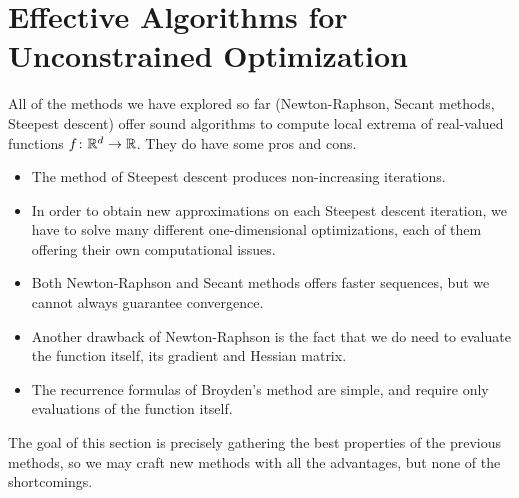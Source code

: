 \section{Effective Algorithms for Unconstrained Optimization}
All of the methods we have explored so far (Newton-Raphson, Secant methods, Steepest descent) offer sound algorithms to compute local extrema of real-valued functions $f \colon \mathbb{R}^d \to \mathbb{R}$. They do have some pros and cons.  
\begin{itemize}
	\item The method of Steepest descent produces non-increasing iterations.
	\item In order to obtain new approximations on each Steepest descent iteration, we have to solve many different one-dimensional optimizations, each of them offering their own computational issues. 
	\item Both Newton-Raphson and Secant methods offers faster sequences, but we cannot always guarantee convergence.  
	\item Another drawback of Newton-Raphson is the fact that we do need to evaluate the function itself, its gradient and Hessian matrix. 
	\item The recurrence formulas of Broyden's method are simple, and require only evaluations of the function itself.
\end{itemize}

The goal of this section is precisely gathering the best properties of the previous methods, so we may craft new methods with all the advantages, but none of the shortcomings.  

\separator

